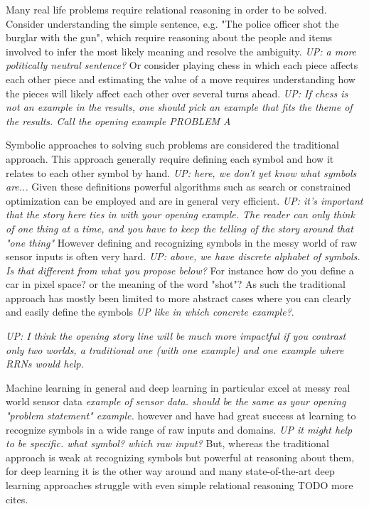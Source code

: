 Many real life problems require relational reasoning in order to be solved. Consider understanding the simple sentence, e.g. "The police officer shot the burglar with the gun", which require reasoning about the people and items involved to infer the most likely meaning and resolve the ambiguity.
\emph{UP: a more politically neutral sentence?}
Or consider playing chess in which each piece affects each other piece and estimating the value of a move requires understanding how the pieces will likely affect each other over several turns ahead.
\emph{UP: If chess is not an example in the results, one should pick an example that fits the theme of the results. Call the opening example PROBLEM A}

Symbolic approaches to solving such problems are considered the traditional approach. This approach generally require defining each symbol and how it relates to each other symbol by hand.
\emph{UP: here, we don't yet know what symbols are...}
Given these definitions powerful algorithms such as search or constrained optimization can be employed and are in general very efficient.
\emph{UP: it's important that the story here ties in with your opening example. The reader can only think of one thing at a time, and you have to keep the telling of the story around that "one thing"}
However defining and recognizing symbols in the messy world of raw sensor inputs is often very hard.
\emph{UP: above, we have discrete alphabet of symbols. Is that different from what you propose below?}
For instance how do you define a car in pixel space? or the meaning of the word "shot"? As such the traditional approach has mostly been limited to more abstract cases where you can clearly and easily define the symbols \emph{UP like in which concrete example?}.

\emph{UP: I think the opening story line will be much more impactful if you contrast only two worlds, a traditional one (with one example) and one example where RRNs would help.}

Machine learning in general and deep learning in particular excel at messy real world sensor data
\emph{example of sensor data. should be the same as your opening "problem statement" example.}
however and have had great success at learning to recognize symbols in a wide range of raw inputs and domains.
\emph{UP it might help to be specific. what symbol? which raw input?}
But, whereas the traditional approach is weak at recognizing symbols but powerful at reasoning about them, for deep learning it is the other way around and many state-of-the-art deep learning approaches struggle with even simple relational reasoning \cite{santoro2017simple} TODO more cites.

